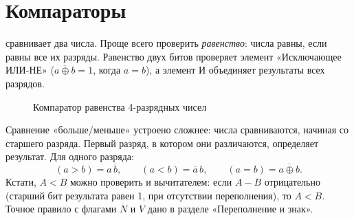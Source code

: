 \section{Компараторы}

 сравнивает два числа. Проще всего проверить
\emph{равенство}: числа равны, если равны все их разряды. Равенство двух
битов проверяет элемент «Исключающее ИЛИ-НЕ» ($\overline{a\oplus b} = 1$,
когда $a = b$), а элемент И объединяет результаты всех разрядов.

\begin{figure}[H]
\centering
{}
\caption{Компаратор равенства 4-разрядных чисел}
\label{fig:cmp}
\end{figure}

Сравнение «больше/меньше» устроено сложнее: числа сравниваются, начиная со
старшего разряда. Первый разряд, в котором они различаются, определяет
результат. Для одного разряда:
\[
  (a > b) = a\,\overline{b}, \qquad (a < b) = \overline{a}\,b, \qquad (a = b) = \overline{a\oplus b}.
\]
Кстати, $A < B$ можно проверить и вычитателем: если $A - B$ отрицательно
(старший бит результата равен 1, при отсутствии переполнения), то $A < B$.
Точное правило с флагами $N$ и $V$ дано в разделе «Переполнение и знак».

